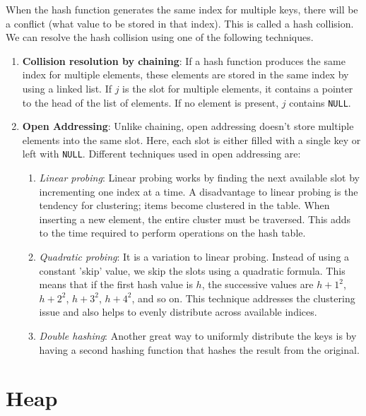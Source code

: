 \documentclass[a4paper,11pt]{book}
\begin{document}
\noindent When the hash function generates the same index for multiple keys, there will be a conflict (what value to be stored in that index). This is called a hash collision. We can resolve the hash collision using one of the following techniques.
\begin{enumerate}
    \item \textbf{Collision resolution by chaining}: If a hash function produces the same index for multiple elements, these elements are stored in the same index by using a linked list. If $j$ is the slot for multiple elements, it contains a pointer to the head of the list of elements. If no element is present, $j$ contains \lstinline{NULL}.
    \item \textbf{Open Addressing}: Unlike chaining, open addressing doesn't store multiple elements into the same slot. Here, each slot is either filled with a single key or left with \lstinline{NULL}. Different techniques used in open addressing are:
    \begin{enumerate}
        \item \textit{Linear probing}: Linear probing works by finding the next available slot by incrementing one index at a time. A disadvantage to linear probing is the tendency for clustering; items become clustered in the table. When inserting a new element, the entire cluster must be traversed. This adds to the time required to perform operations on the hash table.
        \item \textit{Quadratic probing}: It is a variation to linear probing. Instead of using a constant 'skip' value, we skip the slots using a quadratic formula. This means that if the first hash value is $h$, the successive values are $h+1^2$, $h+2^2$, $h+3^2$, $h+4^2$, and so on. This technique addresses the clustering issue and also helps to evenly distribute across available indices.
        \item \textit{Double hashing}: Another great way to uniformly distribute the keys is by having a second hashing function that hashes the result from the original. 
    \end{enumerate}
    
\end{enumerate}

\newpage
\section{Heap}\label{sec:heap}
\end{document}
